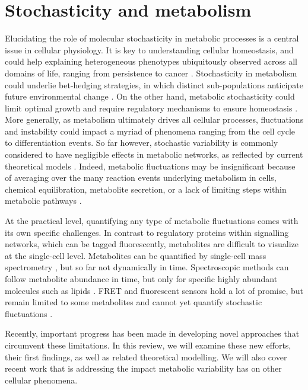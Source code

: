 \section{Stochasticity and metabolism}
Elucidating the role of molecular stochasticity in metabolic processes is a central issue in cellular physiology. It is key to understanding cellular homeostasis, and could help explaining heterogeneous phenotypes ubiquitously observed across all domains of life, ranging from persistence to cancer \cite{Walsh2015, Radzikowski2016}. Stochasticity in metabolism could underlie bet-hedging strategies, in which distinct sub-populations anticipate future environmental change \cite{Kussell2005, Acar2008}. On the other hand, metabolic stochasticity could limit optimal growth and require regulatory mechanisms to ensure homeostasis \cite{Wang2011}. More generally, as metabolism ultimately drives all cellular processes, fluctuations and instability could impact a myriad of phenomena ranging from the cell cycle to differentiation events. So far however, stochastic variability is commonly considered to have negligible effects in metabolic networks, as reflected by current theoretical models \cite{Herrgard2004}. Indeed, metabolic fluctuations may be insignificant because of averaging over the many reaction events underlying metabolism in cells, chemical equilibration, metabolite secretion, or a lack of limiting steps within metabolic pathways \cite{Herrgard2004, Neidhardt1990, Rodriguez2005, Hart2011, Klumpp2009, Yun1996, El-Mansi1989, Wilson2010}. 

At the practical level, quantifying any type of metabolic fluctuations comes with its own specific challenges. In contrast to regulatory proteins within signalling networks, which can be tagged fluorescently, metabolites are difficult to visualize at the single-cell level. Metabolites can be quantified by single-cell mass spectrometry \cite{Esaki2015}, but so far not dynamically in time. Spectroscopic methods can follow metabolite abundance in time, but only for specific highly abundant molecules such as lipids \cite{Yue2016}. FRET and fluorescent sensors hold a lot of promise, but remain limited to some metabolites and cannot yet quantify stochastic fluctuations \cite{Nakai2001, Nagai2001, Yaginuma2014, Imamura2009, Klarenbeek2015}. 

Recently, important progress has been made in developing novel approaches that circumvent these limitations. In this review, we will examine these new efforts, their first findings, as well as related theoretical modelling. We will also cover recent work that is addressing the impact metabolic variability has on other cellular phenomena.

